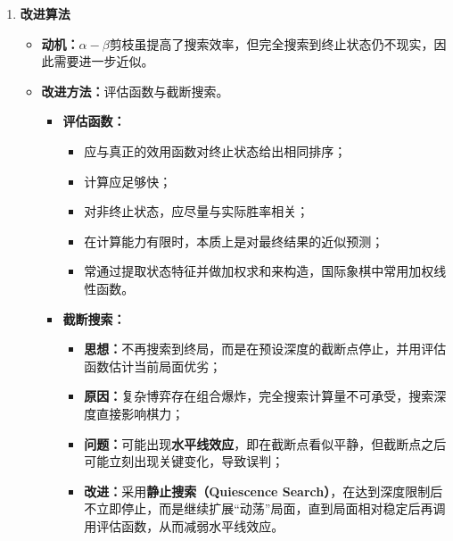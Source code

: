\documentclass[../main.tex]{subfiles}
\begin{document}
\begin{enumerate}
\begin{itemize}
        \item \textbf{两个假设：}零和博弈、双方聪明
    \end{itemize}
    \item \textbf{改进算法}
   \begin{itemize}
        \item \textbf{动机：}$\alpha-\beta$剪枝虽提高了搜索效率，但完全搜索到终止状态仍不现实，因此需要进一步近似。
        \item \textbf{改进方法：}评估函数与截断搜索。
        \begin{itemize}
            \item \textbf{评估函数：}
            \begin{itemize}
                \item 应与真正的效用函数对终止状态给出相同排序；
                \item 计算应足够快；
                \item 对非终止状态，应尽量与实际胜率相关；
                \item 在计算能力有限时，本质上是对最终结果的近似预测；
                \item 常通过提取状态特征并做加权求和来构造，国际象棋中常用加权线性函数。
            \end{itemize}

            \item \textbf{截断搜索：}
            \begin{itemize}
                \item \textbf{思想：}不再搜索到终局，而是在预设深度的截断点停止，并用评估函数估计当前局面优劣；
                \item \textbf{原因：}复杂博弈存在组合爆炸，完全搜索计算量不可承受，搜索深度直接影响棋力；
                \item \textbf{问题：}可能出现\textbf{水平线效应}，即在截断点看似平静，但截断点之后可能立刻出现关键变化，导致误判；
                \item \textbf{改进：}采用\textbf{静止搜索（Quiescence Search）}，在达到深度限制后不立即停止，而是继续扩展“动荡”局面，直到局面相对稳定后再调用评估函数，从而减弱水平线效应。
            \end{itemize}
        \end{itemize}
    \end{itemize}
        
\end{enumerate}
\end{document}
